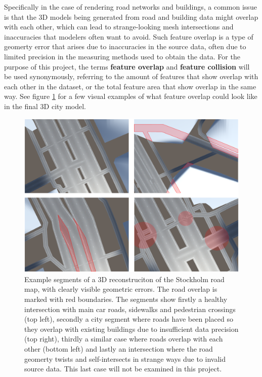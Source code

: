 \documentclass{kththesis}
\begin{document}
Specifically in the case of rendering road networks and buildings, a common issue is that the 3D models being generated from road and building data might overlap with each other, which can lead to strange-looking mesh intersections and inaccuracies that modelers often want to avoid.
Such feature overlap is a type of geomerty error that arises due to inaccuracies in the source data, often due to limited precision in the measuring methods used to obtain the data.
For the purpose of this project, the terms \textbf{feature overlap} and \textbf{feature collision} will be used synonymously, referring to the amount of features that show overlap with each other in the dataset, or the total feature area that show overlap in the same way.
See figure \ref{fig:img_road_error_cases} for a few visual examples of what feature overlap could look like in the final 3D city model.


\begin{figure}[H]
    \centering
    \includegraphics[width=\textwidth,height=0.5\textheight,keepaspectratio]{img_road_error_cases}
    \caption{Example segments of a 3D reconstruciton of the Stockholm road map, with clearly visible geometric errors. The road overlap is marked with red boundaries. The segments show firstly a healthy intersection with main car roads, sidewalks and pedestrian crossings (top left), secondly a city segment where roads have been placed so they overlap with existing buildings due to insufficient data precision (top right), thirdly a similar case where roads overlap with each other (bottom left) and lastly an intersection where the road geomerty twists and self-intersects in strange ways due to invalid source data. This last case will not be examined in this project.}
    \label{fig:img_road_error_cases}
\end{figure}
\end{document}
